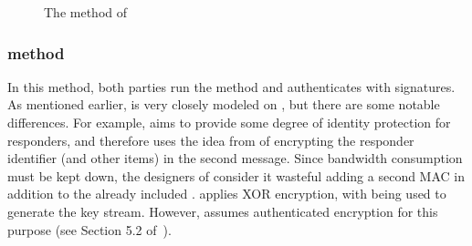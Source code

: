 \begin{figure}[!h]
{}
\caption{The \mStatSig{} method of \mEdhoc}
\label{fig:edhocstatsig}
\end{figure}

\subsubsection{\mSigSig{} method}
In this method, both parties run the \mSig{} method and authenticates with signatures.
%
As mentioned earlier, \mSigSig{} is very closely modeled on \mSigmaI{}, but there are some notable differences.
%
For example, \mEdhoc{} aims to provide some degree of identity protection for responders, and therefore uses the idea from \mSigmaI{} of encrypting the responder identifier \mIdcredr{} (and other items) in the second message.
%
Since bandwidth consumption must be kept down, the designers of \mEdhoc{} consider it wasteful adding a second MAC in addition to the already included \mMactwo{}.
%
\mEdhoc{} applies XOR encryption, with \mHkdf{} being used to generate the key stream.
%
However, \mSigma{} assumes authenticated encryption for this purpose (see Section 5.2 of~\cite{sigma}).
%


